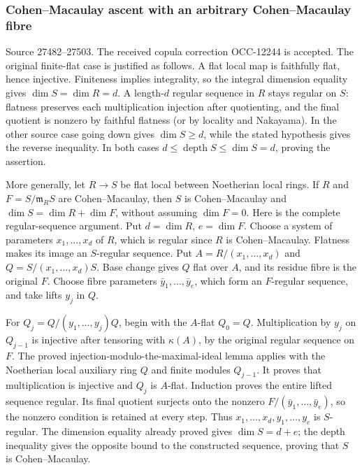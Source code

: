 \subsubsection{Cohen--Macaulay ascent with an arbitrary Cohen--Macaulay fibre}\label{algebra-proof-024-cohenmacaulay-ascent-with-an-arbitrary-cohenmacaulay-fibre}

Source 27482--27503. The received copula correction OCC-12244 is accepted. The original finite-flat case is justified as follows. A flat local map is faithfully flat, hence injective. Finiteness implies integrality, so the integral dimension equality gives \(\dim S=\dim R=d\). A length-\(d\) regular sequence in \(R\) stays regular on \(S\): flatness preserves each multiplication injection after quotienting, and the final quotient is nonzero by faithful flatness (or by locality and Nakayama). In the other source case going down gives \(\dim S\geq d\), while the stated hypothesis gives the reverse inequality. In both cases \(d\leq\operatorname{depth}S\leq\dim S=d\), proving the assertion.

More generally, let \(R\to S\) be flat local between Noetherian local rings. If \(R\) and \(F=S/\mathfrak m_RS\) are Cohen--Macaulay, then \(S\) is Cohen--Macaulay and \(\dim S=\dim R+\dim F\), without assuming \(\dim F=0\). Here is the complete regular-sequence argument. Put \(d=\dim R\), \(e=\dim F\). Choose a system of parameters \(x_1,\ldots,x_d\) of \(R\), which is regular since \(R\) is Cohen--Macaulay. Flatness makes its image an \(S\)-regular sequence. Put \(A=R/(x_1,\ldots,x_d)\) and \(Q=S/(x_1,\ldots,x_d)S\). Base change gives \(Q\) flat over \(A\), and its residue fibre is the original \(F\). Choose fibre parameters \(\bar y_1,\ldots,\bar y_e\), which form an \(F\)-regular sequence, and take lifts \(y_j\) in \(Q\).

For \(Q_j=Q/(y_1,\ldots,y_j)Q\), begin with the \(A\)-flat \(Q_0=Q\). Multiplication by \(y_j\) on \(Q_{j-1}\) is injective after tensoring with \(\kappa(A)\), by the original regular sequence on \(F\). The proved injection-modulo-the-maximal-ideal lemma applies with the Noetherian local auxiliary ring \(Q\) and finite modules \(Q_{j-1}\). It proves that multiplication is injective and \(Q_j\) is \(A\)-flat. Induction proves the entire lifted sequence regular. Its final quotient surjects onto the nonzero \(F/(\bar y_1,\ldots,\bar y_e)\), so the nonzero condition is retained at every step. Thus \(x_1,\ldots,x_d,y_1,\ldots,y_e\) is \(S\)-regular. The dimension equality already proved gives \(\dim S=d+e\); the depth inequality gives the opposite bound to the constructed sequence, proving that \(S\) is Cohen--Macaulay.

